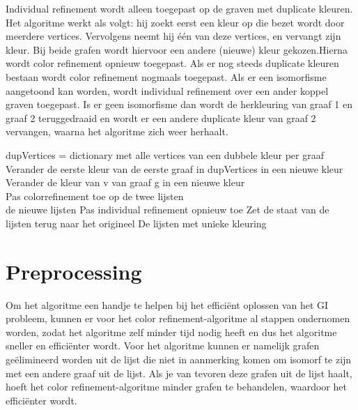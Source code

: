 \documentclass{article}
\begin{document}
Individual refinement wordt alleen toegepast op de graven met duplicate kleuren. Het algoritme werkt als volgt: hij zoekt eerst een kleur op die bezet wordt door meerdere vertices. Vervolgens neemt hij \'e\'en van deze vertices, en vervangt zijn kleur. Bij beide grafen wordt hiervoor een andere (nieuwe) kleur gekozen.Hierna wordt color refinement opnieuw toegepast. Als er nog steeds duplicate kleuren bestaan wordt color refinement nogmaals toegepast. Als er een isomorfisme aangetoond kan worden, wordt individual refinement over een ander koppel graven toegepast. Is er geen isomorfisme dan wordt de herkleuring van graaf 1 en graaf 2 teruggedraaid en wordt er een andere duplicate kleur van graaf 2 vervangen, waarna het algoritme zich weer herhaalt. 
\begin{algorithm}[H]
	dupVertices = dictionary met alle vertices van een dubbele kleur per graaf\\
			Verander de eerste kleur van de eerste graaf in dupVertices in een nieuwe kleur\\
			Verander de kleur van v van graaf g in een nieuwe kleur\\
			Pas colorrefinement toe op de twee lijsten\\
					\Return de nieuwe lijsten
				\Else 
					Pas individual refinement opnieuw toe
						Zet de staat van de lijsten terug naar het origineel
	\Return De lijsten met unieke kleuring
\pagebreak


\section{Preprocessing}
Om het algoritme een handje te helpen bij het effici\"ent oplossen van het GI probleem, kunnen er voor het color refinement-algoritme al stappen ondernomen worden, zodat het algoritme zelf minder tijd nodig heeft en dus het algoritme sneller en effici\"enter wordt.
Voor het algoritme kunnen er namelijk grafen ge\"elimineerd worden uit de lijst die niet in aanmerking komen om isomorf te zijn met een andere graaf uit de lijst. Als je van tevoren deze grafen uit de lijst haalt, hoeft het color refinement-algoritme minder grafen te behandelen, waardoor het effici\"enter wordt.


\end{algorithm}
\end{document}
